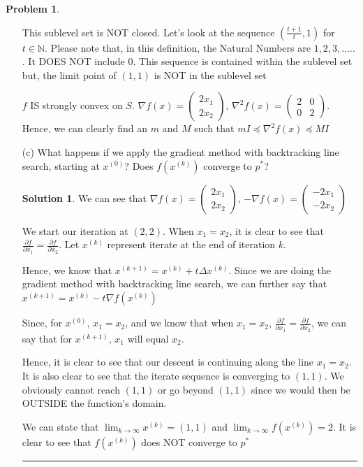 \documentclass{article}
\theoremstyle{definition}
\newtheorem{problem}{Problem}
\def\fline{\rule{0.75\linewidth}{0.5pt}}
\newcommand{\finishline}{\begin{center}\fline\end{center}}
\newtheorem*{solution*}{Solution}
\newenvironment{solution}{\begin{solution*}}{{\finishline} \end{solution*}}
\begin{document}
\begin{problem}
\begin{enumerate}
    This sublevel set is NOT closed. Let's look at the sequence $(\frac{t + 1}{t}, 1)$ for $t \in \mathbb{N}$. Please note that, in this definition, the Natural Numbers are $1, 2, 3, .....$. It DOES NOT include 0.  This sequence is contained within the sublevel set but, the limit point of $(1, 1)$ is NOT in the sublevel set
    
    $f$ IS strongly convex on $S$. $\nabla f(x) = \begin{pmatrix}
2x_1 \\
2x_2
\end{pmatrix}$, $\nabla^2 f(x) = \begin{pmatrix}
2 & 0 \\
0 & 2
\end{pmatrix}$. Hence, we can clearly find an $m$ and $M$ such that $mI \preceq \nabla^2 f(x) \preceq MI$

    \item[(c)] What happens if we apply the gradient method with backtracking line search, starting at $x^{(0)}$? Does $f(x^{(k)})$ converge to $p^*$? 

    \begin{solution}
    We can see that $\nabla f(x) = \begin{pmatrix}
2x_1 \\
2x_2
\end{pmatrix}$, $-\nabla f(x) = \begin{pmatrix}
-2x_1 \\
-2x_2
\end{pmatrix}$

We start our iteration at $(2, 2)$. When $x_1 = x_2$, it is clear to see that $\frac{\partial{f}}{\partial{x_1}} = \frac{\partial{f}}{\partial{x_2}}$. Let $x^{(k)}$ represent iterate at the end of iteration $k$. 

Hence, we know that $x^{(k + 1)} = x^{(k)} + t \Delta x^{(k)}$. Since we are doing the gradient method with backtracking line search, we can further say that  $x^{(k + 1)} = x^{(k)} - t \nabla f(x^{(k)})$

Since, for $x^{(0)}$,  $x_1 = x_2$, and we know that when $x_1 = x_2$, $\frac{\partial{f}}{\partial{x_1}} = \frac{\partial{f}}{\partial{x_2}}$, we can say that for $x^{(k + 1)}$, $x_1$ will equal $x_2$. 

Hence, it is clear to see that our descent is continuing along the line $x_1 = x_2$. It is also clear to see that the iterate sequence is converging to $(1, 1)$.  We obviously cannot reach $(1, 1)$ or go beyond $(1, 1)$ since we would then be OUTSIDE the function's domain.  

We can state that $\lim_{k \to \infty} x^{(k)} = (1, 1)$ and $\lim_{k \to \infty} f(x^{(k)}) = 2$. It is clear to see that $f(x^{(k)})$ does NOT converge to $p^*$
 
    \end{solution}
\end{enumerate}

    
\end{problem}
\end{document}
